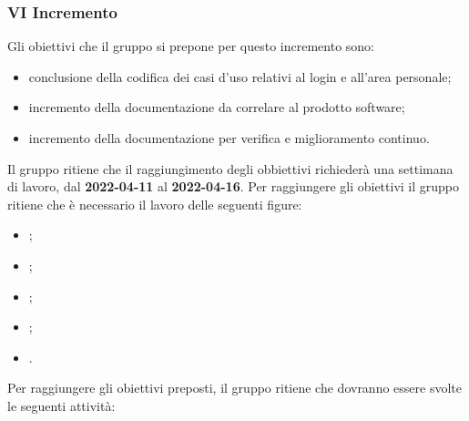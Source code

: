 \pagebreak

\subsubsection{VI Incremento}
Gli obiettivi che il gruppo si prepone per questo incremento sono:
\begin{itemize}
	\item conclusione della codifica dei casi d'uso relativi al login e all'area personale;
 	\item incremento della documentazione da correlare al prodotto software;
	\item incremento della documentazione per verifica e miglioramento continuo.
\end{itemize}
Il gruppo ritiene che il raggiungimento degli obbiettivi richiederà una settimana di lavoro, dal \textbf{2022-04-11} al \textbf{2022-04-16}.
Per raggiungere gli obiettivi il gruppo ritiene che è necessario il lavoro delle seguenti figure:
\begin{itemize}
	\item \RE{};
 	\item \AM{};
   	\item \PT{};
    \item \PR{};
   	\item \VE{}.
\end{itemize}
Per raggiungere gli obiettivi preposti, il gruppo ritiene che dovranno essere svolte le seguenti attività:
